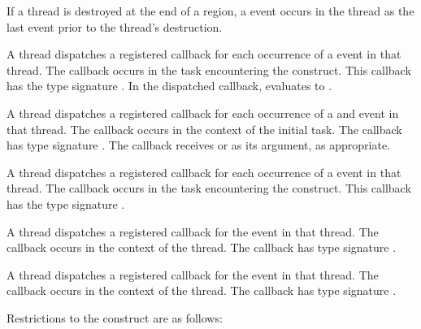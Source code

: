 If a thread is destroyed at the end of a  region, a
 event occurs in the thread as the last
event prior to the thread's destruction.

\tools

A thread dispatches a registered 
callback for each occurrence of a  event in that
thread.  The callback occurs in the task encountering
the  construct.  This callback has the type signature
.
In the dispatched callback, \linebreak {}
evaluates to .

A thread dispatches a registered 
callback for each occurrence of a  and
 event in that thread. The callback occurs in the
context of the initial task.  The callback has type signature
. The callback receives
 or 
as its  argument, as appropriate.

A thread dispatches a registered 
callback for each occurrence of a  event in that
thread.  The callback occurs in the task encountering
the  construct.  This callback has the type signature
.

A thread dispatches a registered 
callback for the  event in that thread.
The callback occurs in the
context of the thread.  The callback has type signature
.

A thread dispatches a registered 
callback for the  event in that thread.
The callback occurs in the context of the thread.  The callback has type signature
.

\restrictions
Restrictions to the  construct are as follows:


